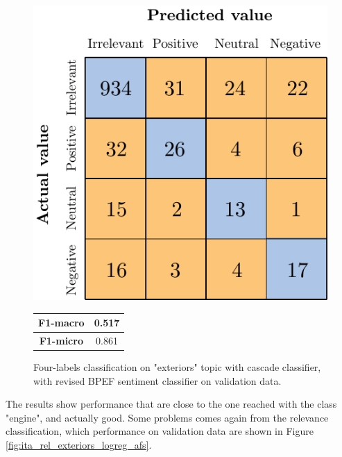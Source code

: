 \begin{figure}[H]
	\begin{minipage}[b]{0.6\linewidth}
		\centering
		\includegraphics[scale=1]{figures/conf_matrices/ita_exteriors/ita_cascade_exteriors_bpef_val.pdf}
	\end{minipage}
	\begin{minipage}[b]{0.3\linewidth}
		\begin{tabular}[b]{ | c | c | } 
			\hline
			\textbf{F1-macro} & 0.517 \\
			\hline
			\textbf{F1-micro} & 0.861 \\ 
			\hline
		\end{tabular}
	\end{minipage}
	\caption{Four-labels classification on "exteriors" topic with cascade classifier, with revised BPEF sentiment classifier on validation data.}
	\label{fig:ita_cascade_exteriors_bpef_val}
\end{figure}


The results show performance that are close to the one reached with the class "engine", and actually good. Some problems comes again from the relevance classification, which performance on validation data are shown in Figure \ref{fig:ita_rel_exteriors_logreg_afs}.

